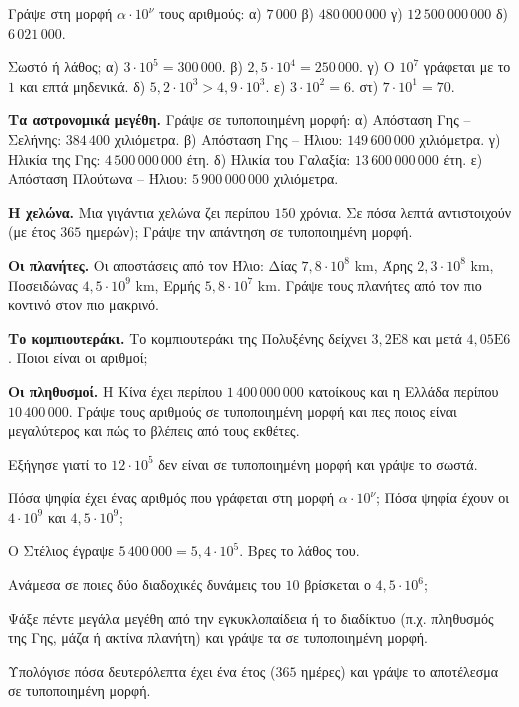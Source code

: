 \ex Γράψε στη μορφή $\alpha\cdot10^{\nu}$ τους αριθμούς: α) $7\,000$ \quad β) $480\,000\,000$ \quad γ) $12\,500\,000\,000$ \quad δ) $6\,021\,000$.

\ex Σωστό ή λάθος; α) $3\cdot10^{5}=300\,000$. \quad β) $2{,}5\cdot10^{4}=250\,000$. \quad γ) Ο $10^{7}$ γράφεται με το $1$ και επτά μηδενικά. \quad δ) $5{,}2\cdot10^{3}>4{,}9\cdot10^{3}$. \quad ε) $3\cdot10^{2}=6$. \quad στ) $7\cdot10^{1}=70$.


\ex \textbf{Τα αστρονομικά μεγέθη.} Γράψε σε τυποποιημένη μορφή: α) Απόσταση Γης -- Σελήνης: $384\,400$ χιλιόμετρα. \quad β) Απόσταση Γης -- Ήλιου: $149\,600\,000$ χιλιόμετρα. \quad γ) Ηλικία της Γης: $4\,500\,000\,000$ έτη. \quad δ) Ηλικία του Γαλαξία: $13\,600\,000\,000$ έτη. \quad ε) Απόσταση Πλούτωνα -- Ήλιου: $5\,900\,000\,000$ χιλιόμετρα.

\ex \textbf{Η χελώνα.} Μια γιγάντια χελώνα ζει περίπου $150$ χρόνια. Σε πόσα λεπτά αντιστοιχούν (με έτος $365$ ημερών); Γράψε την απάντηση σε τυποποιημένη μορφή.

\ex \textbf{Οι πλανήτες.} Οι αποστάσεις από τον Ήλιο: Δίας $7{,}8\cdot10^{8}$ km, Άρης $2{,}3\cdot10^{8}$ km, Ποσειδώνας $4{,}5\cdot10^{9}$ km, Ερμής $5{,}8\cdot10^{7}$ km. Γράψε τους πλανήτες από τον πιο κοντινό στον πιο μακρινό.

\ex \textbf{Το κομπιουτεράκι.} Το κομπιουτεράκι της Πολυξένης δείχνει $3{,}2\mathrm{E}8$ και μετά $4{,}05\mathrm{E}6$. Ποιοι είναι οι αριθμοί;

\ex \textbf{Οι πληθυσμοί.} Η Κίνα έχει περίπου $1\,400\,000\,000$ κατοίκους και η Ελλάδα περίπου $10\,400\,000$. Γράψε τους αριθμούς σε τυποποιημένη μορφή και πες ποιος είναι μεγαλύτερος και πώς το βλέπεις από τους εκθέτες.


\ex Εξήγησε γιατί το $12\cdot10^{5}$ δεν είναι σε τυποποιημένη μορφή και γράψε το σωστά.

\ex Πόσα ψηφία έχει ένας αριθμός που γράφεται στη μορφή $\alpha\cdot10^{\nu}$; Πόσα ψηφία έχουν οι $4\cdot10^{9}$ και $4{,}5\cdot10^{9}$;

\ex Ο Στέλιος έγραψε $5\,400\,000=5{,}4\cdot10^{5}$. Βρες το λάθος του.

\ex Ανάμεσα σε ποιες δύο διαδοχικές δυνάμεις του $10$ βρίσκεται ο $4{,}5\cdot10^{6}$;


\ex Ψάξε πέντε μεγάλα μεγέθη από την εγκυκλοπαίδεια ή το διαδίκτυο (π.χ. πληθυσμός της Γης, μάζα ή ακτίνα πλανήτη) και γράψε τα σε τυποποιημένη μορφή.

\ex Υπολόγισε πόσα δευτερόλεπτα έχει ένα έτος ($365$ ημέρες) και γράψε το αποτέλεσμα σε τυποποιημένη μορφή.
